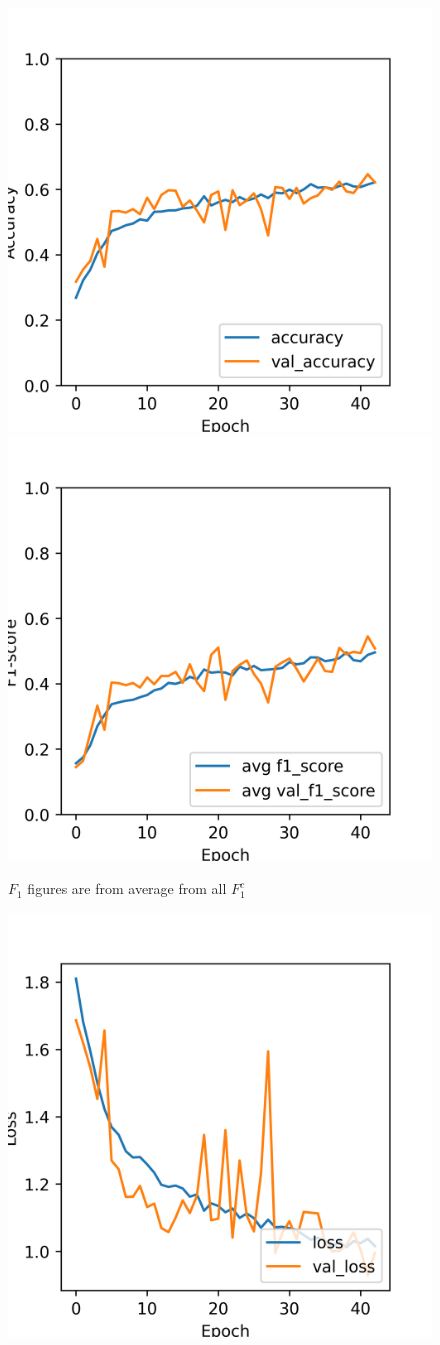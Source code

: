 \begin{figure}[H]
	\centering
	\includegraphics[width=.5\textwidth]{assets/results/preMELD.scratch/model.2dense.aug/learning_history-acc.png}\hfill
	\includegraphics[width=.5\textwidth]{assets/results/preMELD.scratch/model.2dense.aug/learning_history-f1_score.png}\hfill
	\caption{$F_1$ figures are from average from all $F_1^c$}
	\label{fig:figure8}
\end{figure}

\begin{figure}[H]
	\centering
	\includegraphics[width=.5\textwidth]{assets/results/preMELD.scratch/model.2dense.aug/learning_history-loss.png}
	
	\label{fig:figure9}
\end{figure}

